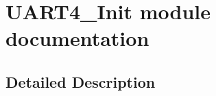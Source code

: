 \hypertarget{group___u_a_r_t4___init__module}{}\section{U\+A\+R\+T4\+\_\+\+Init module documentation}
\label{group___u_a_r_t4___init__module}


\subsection{Detailed Description}
